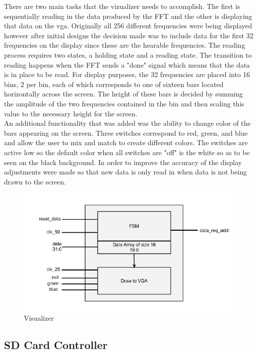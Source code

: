 \documentclass{article}
\begin{document}
There are two main tasks that the vizualizer needs to accomplish.  
The first is sequentially reading in the data produced by the FFT and the 
other is displaying that data on the vga.  Originally all 256 different 
frequencies were being displayed however after initial designs the decision 
made was to include data for the first 32 frequencies on the display since 
these are the hearable frequencies.  The reading process requires two states, 
a holding state and a reading state.  The transition to reading happens when 
the FFT sends a "done" signal which means that the data is in place to be read.  
For display purposes, the 32 frequencies are placed into 16 bins, 2 per bin, 
each of which corresponds to one of sixteen bars located horizontally across 
the screen.  The height of these bars is decided by summing the amplitude of 
the two frequencies contained in the bin and then scaling this value to the 
necessary height for the screen.\\An additional functionality that was added 
was the ability to change color of the bars appearing on the screen.  
Three switches correspond to red, green, and blue and allow the user to mix 
and match to create different colors.  The switches are active low so the 
default color when all switches are "off" is the white so as to be seen on the 
black background.  In order to improve the accuracy of the display adjustments 
were made so that new data is only read in when data is not being drawn to the screen.

\begin{figure}[H]
	\centering
	\includegraphics[scale=0.5]{viz_block_diagram.png}
	\caption{Visualizer}
\end{figure}

\subsection{SD Card Controller}
\end{document}
